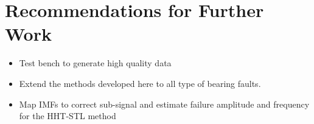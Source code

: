 \documentclass[../Main/thesis.tex]{subfiles}
\begin{document}
	\section{Recommendations for Further Work}
	\label{sec:recommendations_for_further_work}
	
	
	\begin{itemize}
		\item Test bench to generate high quality data
		\item Extend the methods developed here to all type of bearing faults.
		\item Map IMFs to correct sub-signal and estimate failure amplitude and frequency for the HHT-STL method
	\end{itemize}
	
\end{document}
